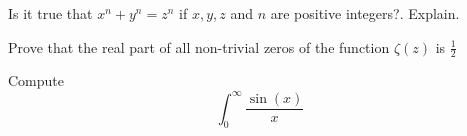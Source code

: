 \documentclass{exam}
\begin{document}
    
\vspace{5mm}
    
\begin{questions}
\question Is it true that \(x^n + y^n = z^n\) if \(x,y,z\) and \(n\) are
positive integers?. Explain.
    
\question Prove that the real part of all non-trivial zeros of the function
\(\zeta(z)\) is \(\frac{1}{2}\)
    
\question Compute \[\int_{0}^{\infty} \frac{\sin(x)}{x}\]
\end{questions}
\end{document}
